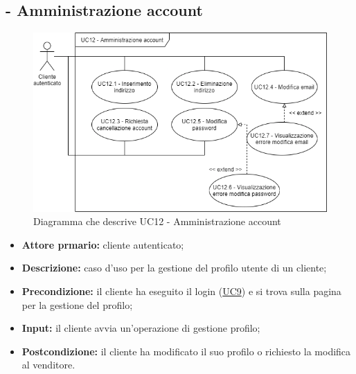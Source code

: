 \stepUserCase
\subsection{ - Amministrazione account}
\begin{figure}[H]
    \centering
    \includegraphics[width=\linewidth]{res/images/UC/UC12.png}
    \caption{Diagramma che descrive UC12 - Amministrazione account}
\end{figure}
\begin{itemize}
    \item \textbf{Attore prmario:} cliente autenticato;
    \item \textbf{Descrizione:} caso d'uso per la gestione del profilo utente di un cliente;
    \item \textbf{Precondizione:} il cliente ha eseguito il login (\hyperref[UC9]{UC9}) e si trova sulla pagina per la gestione del profilo;
    \item \textbf{Input:} il cliente avvia un'operazione di gestione profilo;
    \item \textbf{Postcondizione:} il cliente ha modificato il suo profilo o richiesto la modifica al venditore.
\end{itemize}

\stepsubUserCase
